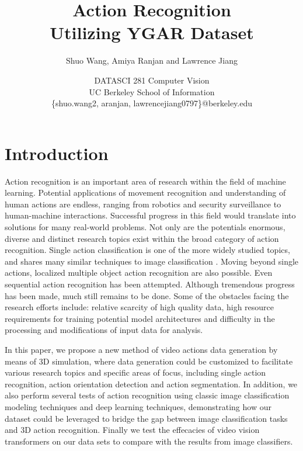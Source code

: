 \documentclass[
	a4paper, %
	10pt, %
	unnumberedsections, %
	twoside, %
]{t0004}
\title{Action Recognition\\ Utilizing YGAR Dataset} %
\author{
	Shuo Wang, Amiya Ranjan and Lawrence Jiang
}
\date{\footnotesize DATASCI 281 Computer Vision \\ UC Berkeley School of Information \\ \{shuo.wang2, aranjan, lawrencejiang0797\}@berkeley.edu}
\begin{document}
\maketitle %

\section{Introduction}

Action recognition is an important area of research within the field of machine learning. Potential applications of movement recognition and understanding of human actions are endless, ranging from robotics and security surveillance to human-machine interactions. Successful progress in this field would translate into solutions for many real-world problems. Not only are the potentials enormous, diverse and distinct research topics exist within the broad category of action recognition. Single action classification\cite{Carreira:2018qr} is one of the more widely studied topics, and shares many similar techniques to image classification \cite{Ren:2015qr}. Moving beyond single actions, localized multiple object action recognition are also possible\cite{Wu:2023qr, Gu:2018qr}. Even sequential action recognition has been attempted\cite{Yeung:2017qr}. Although tremendous progress has been made, much still remains to be done. Some of the obstacles facing the research efforts include: relative scarcity of high quality data\cite{Carreira:2018qr}, high resource requirements for training potential model architectures and difficulty in the processing and modifications of input data for analysis.

In this paper, we propose a new method of video actions data generation by means of 3D simulation, where data generation could be customized to facilitate various research topics and specific areas of focus, including single action recognition, action orientation detection and action segmentation. In addition, we also perform several tests of action recognition using classic image classification modeling techniques and deep learning techniques, demonstrating how our dataset could be leveraged to bridge the gap between image classification tasks and 3D action recognition. Finally we test the effecacies of video vision transformers \cite{Aarnab:2021qr} on our data sets to compare with the results from image classifiers.
\end{document}
